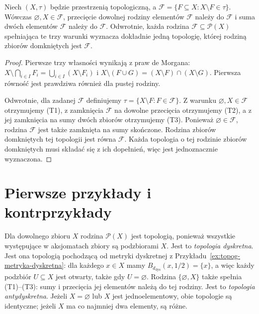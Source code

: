 \begin{stwierdzenie}
\label{prop:topog-zbiory-domkniete}
Niech $(X,\tau)$ będzie przestrzenią topologiczną, a
$\mathcal F=\{F\subseteq X:X\setminus F\in\tau\}$.
Wówczas $\varnothing,X\in\mathcal F$, przecięcie dowolnej
rodziny elementów $\mathcal F$ należy do $\mathcal F$
i suma dwóch elementów $\mathcal F$ należy do $\mathcal F$.
Odwrotnie, każda rodzina $\mathcal F\subseteq\mathcal P(X)$
spełniająca te trzy warunki wyznacza dokładnie jedną topologię,
której rodziną zbiorów domkniętych jest $\mathcal F$.
\end{stwierdzenie}
\begin{proof}
Pierwsze trzy własności wynikają z praw de Morgana:
$X\setminus\bigcap_{i\in I}F_i
=\bigcup_{i\in I}(X\setminus F_i)$ i
$X\setminus(F\cup G)=(X\setminus F)\cap(X\setminus G)$.
Pierwsza równość jest prawdziwa również dla pustej rodziny.

Odwrotnie, dla zadanej $\mathcal F$ definiujemy
$\tau=\{X\setminus F:F\in\mathcal F\}$. Z warunku
$\varnothing,X\in\mathcal F$ otrzymujemy (T1),
z zamknięcia $\mathcal F$ na dowolne przecięcia otrzymujemy
(T2), a z jej zamknięcia na sumy dwóch zbiorów otrzymujemy
(T3). Ponieważ $\varnothing\in\mathcal F$, rodzina
$\mathcal F$ jest także zamknięta na sumy skończone.
Rodzina zbiorów domkniętych tej topologii jest
równa $\mathcal F$. Każda topologia o tej rodzinie
zbiorów domkniętych musi składać się z ich dopełnień,
więc jest jednoznacznie wyznaczona.
\end{proof}

\section{Pierwsze przykłady i kontrprzykłady}
\label{sec:topog-przyklady}

\begin{przyklad}
\label{ex:topog-dyskretna-antydyskretna}
Dla dowolnego zbioru $X$ rodzina $\mathcal P(X)$ jest topologią,
ponieważ wszystkie występujące w aksjomatach zbiory są
podzbiorami $X$. Jest to \emph{topologia dyskretna}.
Jest ona topologią pochodzącą od metryki dyskretnej
z Przykładu~\ref{ex:topog-metryka-dyskretna}: dla każdego $x\in X$
mamy $B_{d_{\mathrm{dys}}}(x,1/2)=\{x\}$, a więc
każdy podzbiór $U\subseteq X$ jest otwarty, także gdy $U=\varnothing$.
Rodzina $\{\varnothing,X\}$ także spełnia (T1)--(T3):
sumy i przecięcia jej elementów należą do tej rodziny.
Jest to \emph{topologia antydyskretna}.
Jeżeli $X=\varnothing$ lub $X$ jest jednoelementowy,
obie topologie są identyczne; jeżeli $X$ ma co najmniej
dwa elementy, są różne.
\end{przyklad}


